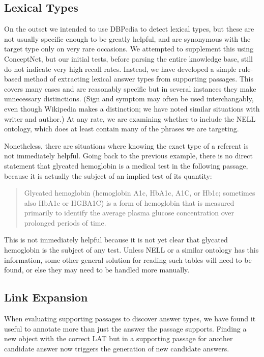 \documentclass[12pt,letterpaper]{article}
\begin{document}
\subsection{Lexical Types}
On the outset we intended to use DBPedia to detect lexical types, but these are not usually specific enough to be greatly helpful, and are synonymous with the target type only on very rare occasions. We attempted to supplement this using ConceptNet, but our initial tests, before parsing the entire knowledge base, still do not indicate very high recall rates. Instead, we have developed a simple rule-based method of extracting lexical answer types from supporting passages. This covers many cases and are reasonably specific but in several instances they make unnecessary distinctions. (Sign and symptom may often be used interchangably, even though Wikipedia makes a distinction; we have noted similar situations with writer and author.) At any rate, we are examining whether to include the NELL ontology, which does at least contain many of the phrases we are targeting.

Nonetheless, there are situations where knowing the exact type of a referent is not immediately helpful. Going back to the previous example, there is no direct statement that glycated hemoglobin is a medical test in the following passage, because it is actually the subject of an implied test of its quantity:
\begin{quote}
Glycated hemoglobin (hemoglobin A1c, HbA1c, A1C, or Hb1c; sometimes also HbA1c or HGBA1C) is a form of hemoglobin that is measured primarily to identify the average plasma glucose concentration over prolonged periods of time.
\end{quote}
This is not immediately helpful because it is not yet clear that glycated hemoglobin is the subject of any test. Unless NELL or a similar ontology has this information, some other general solution for reading such tables will need to be found, or else they may need to be handled more manually.

\subsection{Link Expansion}
When evaluating supporting passages to discover answer types, we have found it useful to annotate more than just the answer the passage supports. Finding a new object with the correct LAT but in a supporting passage for another candidate answer now triggers the generation of new candidate answers.
\end{document}

